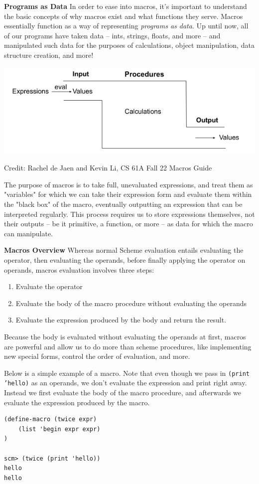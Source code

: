 \textbf{Programs as Data} 
In order to ease into macros, it's important to understand the basic concepts of why macros exist and what functions they serve.
Macros essentially function as a way of representing \textit{programs as data}.
Up until now, all of our programs have taken data -- ints, strings, floats, and more -- and manipulated such data for the purposes of calculations, object manipulation, data structure creation, and more!

\includegraphics{macro_black_box.png}
\caption{Credit: Rachel de Jaen and Kevin Li, CS 61A Fall 22 Macros Guide}

The purpose of macros is to take full, unevaluated expressions, and treat them as "variables" for which we can take their expression form and evaluate them within the "black box" of the macro, eventually outputting an expression that can be interpreted regularly.
This process requires us to store expressions themselves, not their outputs -- be it primitive, a function, or more -- as data for which the macro can manipulate.

\newpage
\textbf{Macros Overview} Whereas normal Scheme evaluation entails evaluating the operator, then evaluating the operands, before finally applying the operator on operands, macros evaluation involves three steps:

\begin{enumerate}[1.]
\item Evaluate the operator
\item Evaluate the body of the macro procedure without evaluating the operands
\item Evaluate the expression produced by the body and return the result.
\end{enumerate}

Because the body is evaluated without evaluating the operands at first, macros are powerful and allow us to do more than scheme procedures, like implementing new special forms, control the order of evaluation, and more. 

Below is a simple example of a macro. Note that even though we pass in \texttt{(print 'hello)} as an operands, we don't evaluate the expression and print right away. Instead we first evaluate the body of the macro procedure, and afterwards we evaluate the expression produced by the macro. 
\vspace{1cm}
\begin{lstlisting}
(define-macro (twice expr)
    (list 'begin expr expr)
)

scm> (twice (print 'hello))
hello
hello
\end{lstlisting}

